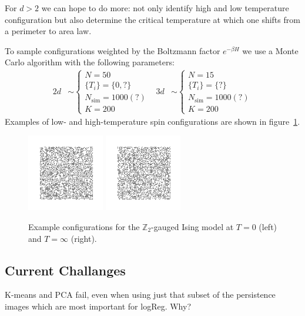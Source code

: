 \documentclass[11pt]{article}
\begin{document}
For $d>2$ we can hope to do more: not only identify high and low temperature configuration but also determine the critical temperature at which one shifts from a perimeter to area law.

To sample configurations weighted by the Boltzmann factor $e^{-\beta H}$ we use a Monte Carlo algorithm with the following parameters:
\begin{align}
    2d&\sim\left\{\begin{array}{l}
        N = 50\\
        \{T_i\} = \{0,?\}\\
        N_\text{sim} = 1000(?)\\
        K = 200
    \end{array}\right. & 3d&\sim\left\{\begin{array}{l}
        N = 15\\
        \{T_i\} = \{?\}\\
        N_\text{sim} = 1000(?)\\
        K = 200
    \end{array}\right.
\end{align}
Examples of low- and high-temperature spin configurations are shown in figure~\ref{fig:GaugedExampleConfigs}.

\begin{figure}[h]
    \centering
    \includegraphics[width=0.3\textwidth]{gauged_images/gauged_T=0.png}
    \includegraphics[width=0.3\textwidth]{gauged_images/gauged_T=inf.png}
    \caption{Example configurations for the $\mathbb{Z}_2$-gauged Ising model at $T=0$ (left) and $T=\infty$ (right).}
    \label{fig:GaugedExampleConfigs}
\end{figure}


\subsection{Current Challanges}
K-means and PCA fail, even when using just that subset of the persistence images which are most important for logReg. Why?
\end{document}
